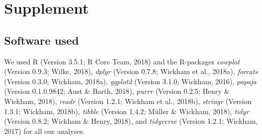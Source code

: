 \documentclass[man,floatsintext]{apa6}
\begin{document}
\hypertarget{supplement}{%
\section{Supplement}\label{supplement}}

\hypertarget{software-used}{%
\subsection{Software used}\label{software-used}}

We used R (Version 3.5.1; R Core Team, 2018) and the R-packages
\emph{cowplot} (Version 0.9.3; Wilke, 2018), \emph{dplyr} (Version
0.7.8; Wickham et al., 2018a), \emph{forcats} (Version 0.3.0; Wickham,
2018a), \emph{ggplot2} (Version 3.1.0; Wickham, 2016), \emph{papaja}
(Version 0.1.0.9842; Aust \& Barth, 2018), \emph{purrr} (Version 0.2.5;
Henry \& Wickham, 2018), \emph{readr} (Version 1.2.1; Wickham et al.,
2018b), \emph{stringr} (Version 1.3.1; Wickham, 2018b), \emph{tibble}
(Version 1.4.2; Müller \& Wickham, 2018), \emph{tidyr} (Version 0.8.2;
Wickham \& Henry, 2018), and \emph{tidyverse} (Version 1.2.1; Wickham,
2017) for all our analyses.
\end{document}

